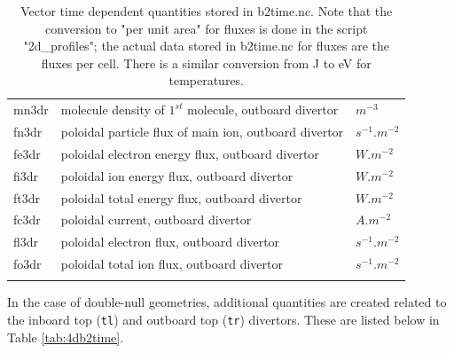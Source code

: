 \documentclass[a4paper,10pt]{report}
\begin{document}
\begin{center}
\begin{longtable}{|l|l|l|}
mn3dr \index{mn3dr}\index{b2time.nc, mn3dr} & molecule density of $1^{st}$ molecule, outboard divertor & $m^{-3}$ \\
fn3dr \index{fn3dr}\index{b2time.nc, fn3dr} & poloidal particle flux of main ion, outboard divertor & $s^{-1}.m^{-2}$ \\
fe3dr \index{fe3dr}\index{b2time.nc, fe3dr} & poloidal electron energy flux, outboard divertor & $W.m^{-2}$ \\
fi3dr \index{fi3dr}\index{b2time.nc, fi3dr} & poloidal ion energy flux, outboard divertor & $W.m^{-2}$ \\
ft3dr \index{ft3dr}\index{b2time.nc, ft3dr} & poloidal total energy flux, outboard divertor & $W.m^{-2}$ \\
fc3dr \index{fc3dr}\index{b2time.nc, fc3dr} & poloidal current, outboard divertor & $A.m^{-2}$ \\
fl3dr \index{fl3dr}\index{b2time.nc, fl3dr} & poloidal electron flux, outboard divertor & $s^{-1}.m^{-2}$ \\
fo3dr \index{fo3dr}\index{b2time.nc, fo3dr} & poloidal total ion flux, outboard divertor & $s^{-1}.m^{-2}$ \\
    \hline
    \caption{Vector time dependent quantities stored in b2time.nc.
       Note that the conversion to "per unit area" for fluxes is done
       in the script "2d\_profiles"; the actual data stored in
       b2time.nc for fluxes are the fluxes per cell. There is a
       similar conversion from J to eV for temperatures.}
    \label{tab:3db2time}
  \end{longtable}
\end{center}

In the case of double-null geometries, additional quantities are
created related to the inboard top ({\tt tl}) and
outboard top ({\tt tr}) divertors. These are listed below in
Table \ref{tab:4db2time}.
\end{document}
